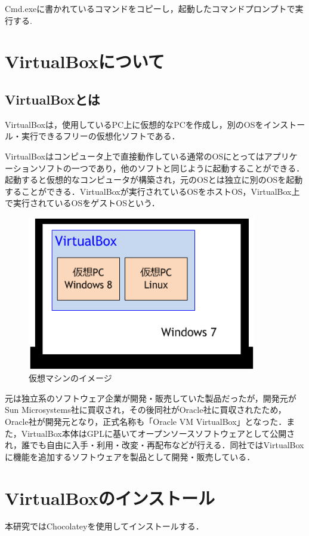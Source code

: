 Cmd.exeに書かれているコマンドをコピーし，起動したコマンドプロンプトで実行する.

\newpage

\section{VirtualBoxについて}
\subsection{VirtualBoxとは}
VirtualBoxは，使用しているPC上に仮想的なPCを作成し，別のOSをインストール・実行できるフリーの仮想化ソフトである．

VirtualBoxはコンピュータ上で直接動作している通常のOSにとってはアプリケーションソフトの一つであり，他のソフトと同じように起動することができる．起動すると仮想的なコンピュータが構築され，元のOSとは独立に別のOSを起動することができる．VirtualBoxが実行されているOSをホストOS，VirtualBox上で実行されているOSをゲストOSという．

\begin{figure}[h]
\centering
\includegraphics[width=10cm]{virtualbox1.png}
\caption{仮想マシンのイメージ}\label{サンプル図}
\end{figure}

元は独立系のソフトウェア企業が開発・販売していた製品だったが，開発元がSun Microsystems社に買収され，その後同社がOracle社に買収されたため，Oracle社が開発元となり，正式名称も「Oracle VM VirtualBox」となった．また，VirtualBox本体はGPLに基いてオープンソースソフトウェアとして公開され，誰でも自由に入手・利用・改変・再配布などが行える．同社ではVirtualBoxに機能を追加するソフトウェアを製品として開発・販売している．

\newpage

\section{VirtualBoxのインストール}
本研究ではChocolateyを使用してインストールする．

